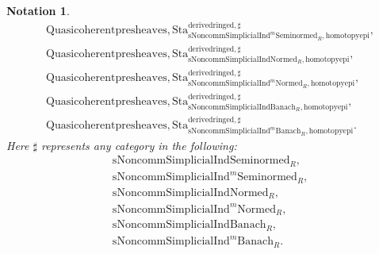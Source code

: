 \documentclass[12pt]{book}
\newtheorem{notation}{Notation}
\begin{document}
\begin{notation}
\begin{align}
&\mathrm{Quasicoherentpresheaves,Sta}^\mathrm{derivedringed,\sharp}_{\mathrm{sNoncomm}\mathrm{Simplicial}\mathrm{Ind}^m\mathrm{Seminormed}_R,\mathrm{homotopyepi}},\\
&\mathrm{Quasicoherentpresheaves,Sta}^\mathrm{derivedringed,\sharp}_{\mathrm{sNoncomm}\mathrm{Simplicial}\mathrm{Ind}\mathrm{Normed}_R,\mathrm{homotopyepi}},\\
&\mathrm{Quasicoherentpresheaves,Sta}^\mathrm{derivedringed,\sharp}_{\mathrm{sNoncomm}\mathrm{Simplicial}\mathrm{Ind}^m\mathrm{Normed}_R,\mathrm{homotopyepi}},\\
&\mathrm{Quasicoherentpresheaves,Sta}^\mathrm{derivedringed,\sharp}_{\mathrm{sNoncomm}\mathrm{Simplicial}\mathrm{Ind}\mathrm{Banach}_R,\mathrm{homotopyepi}},\\
&\mathrm{Quasicoherentpresheaves,Sta}^\mathrm{derivedringed,\sharp}_{\mathrm{sNoncomm}\mathrm{Simplicial}\mathrm{Ind}^m\mathrm{Banach}_R,\mathrm{homotopyepi}}.	
\end{align}
Here $\sharp$ represents any category in the following:
\begin{align}
&\mathrm{sNoncomm}\mathrm{Simplicial}\mathrm{Ind}\mathrm{Seminormed}_R,\\
&\mathrm{sNoncomm}\mathrm{Simplicial}\mathrm{Ind}^m\mathrm{Seminormed}_R,\\
&\mathrm{sNoncomm}\mathrm{Simplicial}\mathrm{Ind}\mathrm{Normed}_R,\\
&\mathrm{sNoncomm}\mathrm{Simplicial}\mathrm{Ind}^m\mathrm{Normed}_R,\\
&\mathrm{sNoncomm}\mathrm{Simplicial}\mathrm{Ind}\mathrm{Banach}_R,\\
&\mathrm{sNoncomm}\mathrm{Simplicial}\mathrm{Ind}^m\mathrm{Banach}_R.	
\end{align} 
\end{notation}
\end{document}
